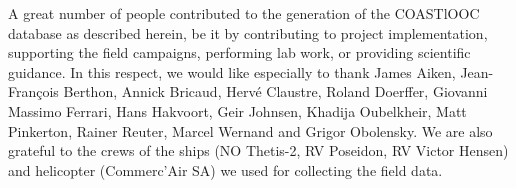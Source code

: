 \documentclass[essd, manuscript]{copernicus}
\begin{document}

\begin{acknowledgements}
    A great number of people contributed to the generation of the COASTlOOC database as described herein, be it by contributing to project implementation, supporting the field campaigns, performing lab work, or providing scientific guidance. In this respect, we would like especially to thank James Aiken, Jean-François Berthon, Annick Bricaud, Hervé Claustre, Roland Doerffer, Giovanni Massimo Ferrari, Hans Hakvoort, Geir Johnsen, Khadija Oubelkheir, Matt Pinkerton, Rainer Reuter, Marcel Wernand and Grigor Obolensky. We are also grateful to the crews of the ships (NO Thetis-2, RV Poseidon, RV Victor Hensen) and helicopter (Commerc'Air SA) we used for collecting the field data.
\end{acknowledgements}





\end{document}
